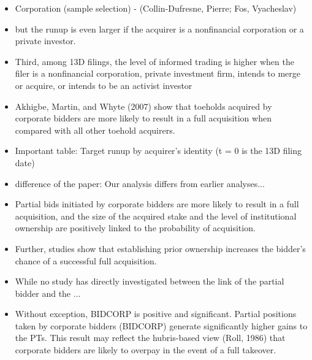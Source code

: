 \documentclass[12pt]{article}
\begin{document}
    \begin{itemize}

        \item Corporation (sample selection) - (Collin-Dufresne, Pierre; Fos, Vyacheslav)

        \item but the runup is even larger if the acquirer is a nonfinancial corporation or a private investor.\citep{Brigida2012}

        \item Third, among 13D filings, the level of informed trading is higher when the filer is a nonfinancial corporation, private investment firm, intends to merge or acquire, or intends to be an activist investor \citep{Brigida2012}

        \item Akhigbe, Martin, and Whyte (2007) show that toeholds acquired by corporate bidders are more likely to result in a full acquisition when compared with all other toehold acquirers.\citep{Brigida2012}

        \item Important table: Target runup by acquirer's identity (t = 0 is the 13D filing date) \citep{Brigida2012}

        \item difference of the paper: Our analysis differs from earlier analyses...\citep{Brigida2012}


        \item Partial bids initiated by corporate bidders are more likely to result in a full acquisition, and the size of the acquired stake and the level of institutional ownership are positively linked to the probability of acquisition. \citep{Akhigbe2007}

        \item Further, studies show that establishing prior ownership increases the bidder’s chance of a successful full acquisition. \citep{Akhigbe2007}

        \item While no study has directly investigated between the link of the partial bidder and the ... \citep{Akhigbe2007}

        \item Without exception, BIDCORP is positive and significant. Partial positions taken by corporate bidders (BIDCORP) generate significantly higher gains to the PTs. This result may reflect the hubris-based view (Roll, 1986) that corporate bidders are likely to overpay in the event of a full takeover. \citep{Akhigbe2007}


\end{itemize}
\end{document}
